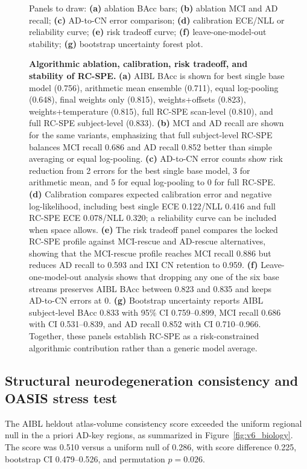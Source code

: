 \documentclass[12pt,a4paper]{article}
\begin{document}
\begin{figure}[p]
{\begin{minipage}[c][0.60\textheight][c]{0.94\textwidth}
    \vspace{0.8em}
    Panels to draw: \textbf{(a)} ablation BAcc bars; \textbf{(b)} ablation MCI and AD recall; \textbf{(c)} AD-to-CN error comparison; \textbf{(d)} calibration ECE/NLL or reliability curve; \textbf{(e)} risk tradeoff curve; \textbf{(f)} leave-one-model-out stability; \textbf{(g)} bootstrap uncertainty forest plot.
    \end{minipage}}
    \caption{\textbf{Algorithmic ablation, calibration, risk tradeoff, and stability of RC-SPE.} \textbf{(a)} AIBL BAcc is shown for best single base model (0.756), arithmetic mean ensemble (0.711), equal log-pooling (0.648), final weights only (0.815), weights+offsets (0.823), weights+temperature (0.815), full RC-SPE scan-level (0.810), and full RC-SPE subject-level (0.833). \textbf{(b)} MCI and AD recall are shown for the same variants, emphasizing that full subject-level RC-SPE balances MCI recall 0.686 and AD recall 0.852 better than simple averaging or equal log-pooling. \textbf{(c)} AD-to-CN error counts show risk reduction from 2 errors for the best single base model, 3 for arithmetic mean, and 5 for equal log-pooling to 0 for full RC-SPE. \textbf{(d)} Calibration compares expected calibration error and negative log-likelihood, including best single ECE 0.122/NLL 0.416 and full RC-SPE ECE 0.078/NLL 0.320; a reliability curve can be included when space allows. \textbf{(e)} The risk tradeoff panel compares the locked RC-SPE profile against MCI-rescue and AD-rescue alternatives, showing that the MCI-rescue profile reaches MCI recall 0.886 but reduces AD recall to 0.593 and IXI CN retention to 0.959. \textbf{(f)} Leave-one-model-out analysis shows that dropping any one of the six base streams preserves AIBL BAcc between 0.823 and 0.835 and keeps AD-to-CN errors at 0. \textbf{(g)} Bootstrap uncertainty reports AIBL subject-level BAcc 0.833 with 95\% CI 0.759--0.899, MCI recall 0.686 with CI 0.531--0.839, and AD recall 0.852 with CI 0.710--0.966. Together, these panels establish RC-SPE as a risk-constrained algorithmic contribution rather than a generic model average.}
    \label{fig:v6_stability}
\end{figure}

\subsection{Structural neurodegeneration consistency and OASIS stress test}
\label{sec:bio_results}

The AIBL heldout atlas-volume consistency score exceeded the uniform regional null in the a priori AD-key regions, as summarized in Figure~\ref{fig:v6_biology}. The score was 0.510 versus a uniform null of 0.286, with score difference 0.225, bootstrap CI 0.479--0.526, and permutation $p=0.026$.
\end{document}
